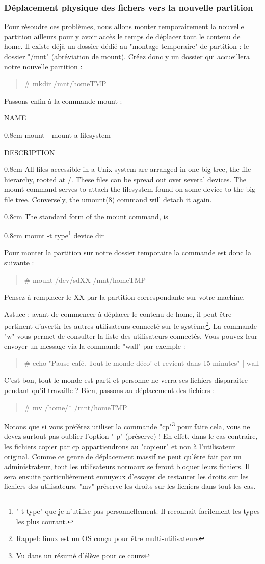 \documentclass[a4paper,11pt]{article}
\newcommand{\commande}[1] {
    \begin{quote}
    \tt\raggedright #1 
    \end{quote}
}
\newcommand{\man}[2]{
    \begin{tcolorbox}[toprule=3mm,width=\textwidth,outer arc=0mm,colbacktitle=grayman,coltitle=black,colback={grayman},colframe={grayman},title={man : \tt #1}]
        \tt\raggedright #2
    \end{tcolorbox}
}
\newcommand{\mandesc}[1]{
    \begin{adjustwidth}{0.8cm}{}
        #1
    \end{adjustwidth}
}
\begin{document}
\subsubsection{Déplacement physique des fichers vers la nouvelle partition}
\par Pour résoudre ces problèmes, nous allons monter temporairement la nouvelle partition ailleurs pour y avoir accès le temps de déplacer tout le contenu de home. Il existe déjà un dossier dédié au "montage temporaire" de partition : le dossier "/mnt" (abréviation de mount). Créez donc y un dossier qui accueillera notre nouvelle partition :
\commande{\# mkdir /mnt/homeTMP}
\par Passons enfin à la commande mount :
\man{mount}{NAME
\mandesc{mount - mount a filesystem}
DESCRIPTION
\mandesc{All  files  accessible  in  a  Unix  system are arranged in one big tree, the file hierarchy, rooted at /.  These files can be spread out over several devices. The mount command serves to attach the filesystem found on some device to the big file tree. Conversely, the umount(8) command will detach it again.}
\mandesc{The standard form of the mount command, is
    \mandesc{mount -t type\footnote{"-t type" que je n'utilise pas personnellement. Il reconnait facilement les types les plus courant.} device dir}
}}
\par Pour monter la partition sur notre dossier temporaire la commande est donc la suivante :
\commande{\# mount /dev/sdXX /mnt/homeTMP}
\par Pensez à remplacer le XX par la partition correspondante sur votre machine.
\par Astuce : avant de commencer à déplacer le contenu de home, il peut être pertinent d'avertir les autres utilisateurs connecté sur le système\footnote{Rappel: linux est un OS conçu pour être multi-utilisateurs}. La commande "w" vous permet de consulter la liste des utilisateurs connectés. Vous pouvez leur envoyer un message via la commande "wall" par exemple :
\commande{\# echo "Pause café. Tout le monde déco' et revient dans 15 minutes" | wall}
\par C'est bon, tout le monde est parti et personne ne verra ses fichiers disparaitre pendant qu'il travaille ? Bien, passons au déplacement des fichiers :
\commande{\# mv /home/* /mnt/homeTMP}
\par Notons que si vous préférez utiliser la commande "cp"\footnote{Vu dans un résumé d'élève pour ce cours} pour faire cela, vous ne devez surtout pas oublier l'option "-p" (préserve) ! En effet, dans le cas contraire, les fichiers copier par cp appartiendrons au "copieur" et non à l'utilisateur original. Comme ce genre de déplacement massif ne peut qu'être fait par un administrateur, tout les utilisateurs normaux se feront bloquer leurs fichiers. Il sera ensuite particulièrement ennuyeux d'essayer de restaurer les droits sur les fichiers des utilisateurs. "mv" préserve les droits sur les fichiers dans tout les cas.
\end{document}
